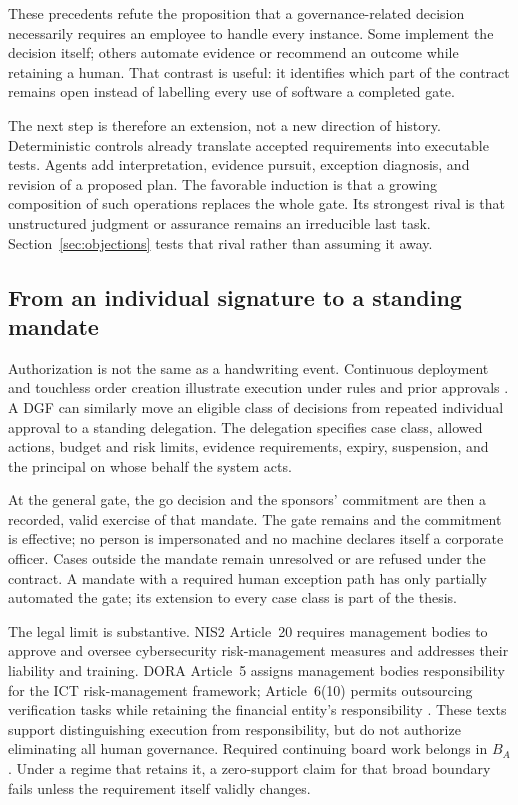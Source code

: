 These precedents refute the proposition that a governance-related decision necessarily requires an
employee to handle every instance. Some implement the decision itself; others automate evidence or
recommend an outcome while retaining a human. That contrast is useful: it identifies which part of the
contract remains open instead of labelling every use of software a completed gate.

The next step is therefore an extension, not a new direction of history. Deterministic controls
already translate accepted requirements into executable tests. Agents add interpretation, evidence
pursuit, exception diagnosis, and revision of a proposed plan. The favorable induction is that a
growing composition of such operations replaces the whole gate. Its strongest rival is that
unstructured judgment or assurance remains an irreducible last task. Section~\ref{sec:objections} tests
that rival rather than assuming it away.

\subsection{From an individual signature to a standing mandate}
\label{sec:mandate}

Authorization is not the same as a handwriting event. Continuous deployment and touchless order
creation illustrate execution under rules and prior approvals \citep{awscd2026,oracle2026}. A DGF can
similarly move an eligible class of decisions from repeated individual approval to a standing
delegation. The delegation specifies case class, allowed actions, budget and risk limits, evidence
requirements, expiry, suspension, and the principal on whose behalf the system acts.

At the general gate, the go decision and the sponsors' commitment are then a recorded, valid exercise of
that mandate. The gate remains and the commitment is effective; no person is impersonated and no machine declares itself a corporate officer. Cases
outside the mandate remain unresolved or are refused under the contract. A mandate with a required
human exception path has only partially automated the gate; its extension to every case class is part
of the thesis.

The legal limit is substantive. NIS2 Article~20 requires management bodies to approve and oversee
cybersecurity risk-management measures and addresses their liability and training. DORA Article~5
assigns management bodies responsibility for the ICT risk-management framework; Article~6(10) permits
outsourcing verification tasks while retaining the financial entity's responsibility
\citep{nis2,dora}. These texts support distinguishing execution from responsibility, but do not
authorize eliminating all human governance. Required continuing board work belongs in $B_A$. Under a
regime that retains it, a zero-support claim for that broad boundary fails unless the requirement
itself validly changes.

